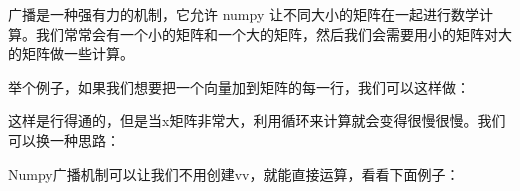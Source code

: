 


广播是一种强有力的机制，它允许 numpy 让不同大小的矩阵在一起进行数学计算。我们常常会有一个小的矩阵和一个大的矩阵，然后我们会需要用小的矩阵对大的矩阵做一些计算。

举个例子，如果我们想要把一个向量加到矩阵的每一行，我们可以这样做：



这样是行得通的，但是当x矩阵非常大，利用循环来计算就会变得很慢很慢。我们可以换一种思路：








Numpy广播机制可以让我们不用创建vv，就能直接运算，看看下面例子：






